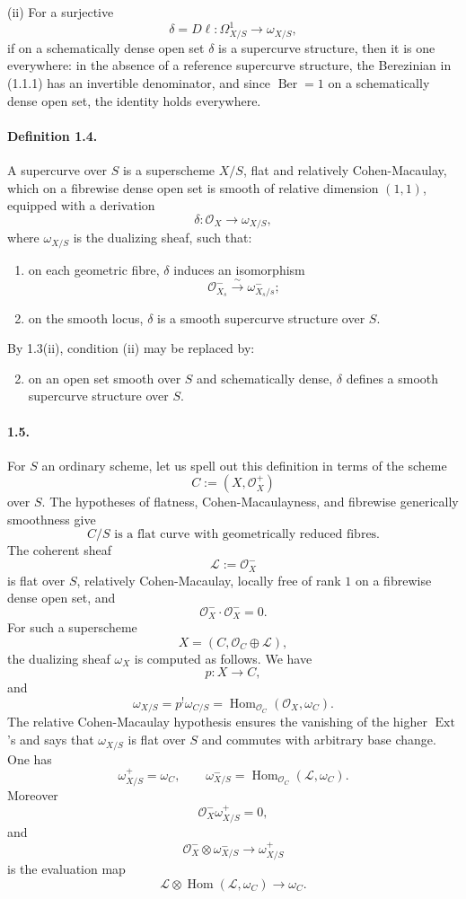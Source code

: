 \documentclass[11pt]{article}
\newcommand{\cO}{\mathcal O}
\newcommand{\cL}{\mathcal L}
\newcommand{\Ber}{\operatorname{Ber}}
\newcommand{\Hom}{\operatorname{Hom}}
\begin{document}
(ii) For a surjective
\[
  \delta=D\ell:\Omega^1_{X/S}\longrightarrow\omega_{X/S},
\]
if on a schematically dense open set $\delta$ is a supercurve structure, then it is one everywhere: in the absence of a reference supercurve structure, the Berezinian in (1.1.1) has an invertible denominator, and since $\Ber=1$ on a schematically dense open set, the identity holds everywhere.

\paragraph{Definition 1.4.}
A supercurve over $S$ is a superscheme $X/S$, flat and relatively Cohen-Macaulay, which on a fibrewise dense open set is smooth of relative dimension $(1,1)$, equipped with a derivation
\[
  \delta:\cO_X\longrightarrow\omega_{X/S},
\]
where $\omega_{X/S}$ is the dualizing sheaf, such that:
\begin{enumerate}[label=(\roman*)]
\item on each geometric fibre, $\delta$ induces an isomorphism
\[
  \cO_{X_s}^-\xrightarrow{\sim}\omega_{X_s/s}^-;
\]
\item on the smooth locus, $\delta$ is a smooth supercurve structure over $S$.
\end{enumerate}
By 1.3(ii), condition (ii) may be replaced by:
\begin{enumerate}[label=(\roman*${}'$)]
\setcounter{enumi}{1}
\item on an open set smooth over $S$ and schematically dense, $\delta$ defines a smooth supercurve structure over $S$.
\end{enumerate}

\paragraph{1.5.}
For $S$ an ordinary scheme, let us spell out this definition in terms of the scheme
\[
  C:=(X,\cO_X^+)
\]
over $S$. The hypotheses of flatness, Cohen-Macaulayness, and fibrewise generically smoothness give
\begin{equation}\tag{1.5.1}
  C/S\text{ is a flat curve with geometrically reduced fibres.}
\end{equation}
The coherent sheaf
\[
  \cL:=\cO_X^-
\]
is flat over $S$, relatively Cohen-Macaulay, locally free of rank $1$ on a fibrewise dense open set, and
\[
  \cO_X^-\cdot\cO_X^-=0.
\]
For such a superscheme
\[
  X=(C,\cO_C\oplus\cL),
\]
the dualizing sheaf $\omega_X$ is computed as follows. We have
\[
  p:X\longrightarrow C,
\]
and
\[
  \omega_{X/S}=p^!\omega_{C/S}=\Hom_{\cO_C}(\cO_X,\omega_C).
\]
The relative Cohen-Macaulay hypothesis ensures the vanishing of the higher $\operatorname{Ext}$'s and says that $\omega_{X/S}$ is flat over $S$ and commutes with arbitrary base change. One has
\[
  \omega_{X/S}^+=\omega_C,
  \qquad
  \omega_{X/S}^-=\Hom_{\cO_C}(\cL,\omega_C).
\]
Moreover
\[
  \cO_X^-\omega_{X/S}^+=0,
\]
and
\[
  \cO_X^-\otimes\omega_{X/S}^-\to\omega_{X/S}^+
\]
is the evaluation map
\[
  \cL\otimes\Hom(\cL,\omega_C)\to\omega_C.
\]
\end{document}
